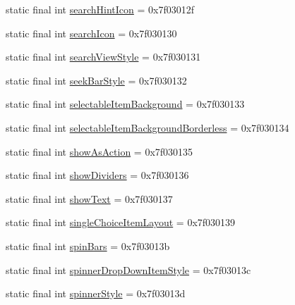 \begin{DoxyCompactItemize}
\item 
static final int \mbox{\hyperlink{classcom_1_1google_1_1android_1_1gms_1_1R_1_1attr_a76038465f3af729d6da2fea9a6aed521}{search\+Hint\+Icon}} = 0x7f03012f
\item 
static final int \mbox{\hyperlink{classcom_1_1google_1_1android_1_1gms_1_1R_1_1attr_a2ebc8ffe77ca992b5701f99421d2d862}{search\+Icon}} = 0x7f030130
\item 
static final int \mbox{\hyperlink{classcom_1_1google_1_1android_1_1gms_1_1R_1_1attr_a95084c29023ca18927dd22f5fbd6c8a5}{search\+View\+Style}} = 0x7f030131
\item 
static final int \mbox{\hyperlink{classcom_1_1google_1_1android_1_1gms_1_1R_1_1attr_a4edc3f7753c446a6697066e3967efe2b}{seek\+Bar\+Style}} = 0x7f030132
\item 
static final int \mbox{\hyperlink{classcom_1_1google_1_1android_1_1gms_1_1R_1_1attr_adf77489271d6e33b43a551d926a8932d}{selectable\+Item\+Background}} = 0x7f030133
\item 
static final int \mbox{\hyperlink{classcom_1_1google_1_1android_1_1gms_1_1R_1_1attr_aa1c471ef9991311dc269382a536eca54}{selectable\+Item\+Background\+Borderless}} = 0x7f030134
\item 
static final int \mbox{\hyperlink{classcom_1_1google_1_1android_1_1gms_1_1R_1_1attr_a60633f1382c9ae52151f6264138c8bbc}{show\+As\+Action}} = 0x7f030135
\item 
static final int \mbox{\hyperlink{classcom_1_1google_1_1android_1_1gms_1_1R_1_1attr_afc5492ca83d0950762ce6d4f6ec831e7}{show\+Dividers}} = 0x7f030136
\item 
static final int \mbox{\hyperlink{classcom_1_1google_1_1android_1_1gms_1_1R_1_1attr_abaeed03aa884a7a08f0fa634462fe94d}{show\+Text}} = 0x7f030137
\item 
static final int \mbox{\hyperlink{classcom_1_1google_1_1android_1_1gms_1_1R_1_1attr_a695c63c9bcd78064ff0f107c78fe7979}{single\+Choice\+Item\+Layout}} = 0x7f030139
\item 
static final int \mbox{\hyperlink{classcom_1_1google_1_1android_1_1gms_1_1R_1_1attr_a999660368fe4051f64980799498c68ee}{spin\+Bars}} = 0x7f03013b
\item 
static final int \mbox{\hyperlink{classcom_1_1google_1_1android_1_1gms_1_1R_1_1attr_a9f0550b13e8ad818a54e7a5182d87933}{spinner\+Drop\+Down\+Item\+Style}} = 0x7f03013c
\item 
static final int \mbox{\hyperlink{classcom_1_1google_1_1android_1_1gms_1_1R_1_1attr_a5b0e314f20cccf575f0f1bacaee72afe}{spinner\+Style}} = 0x7f03013d

\end{DoxyCompactItemize}
